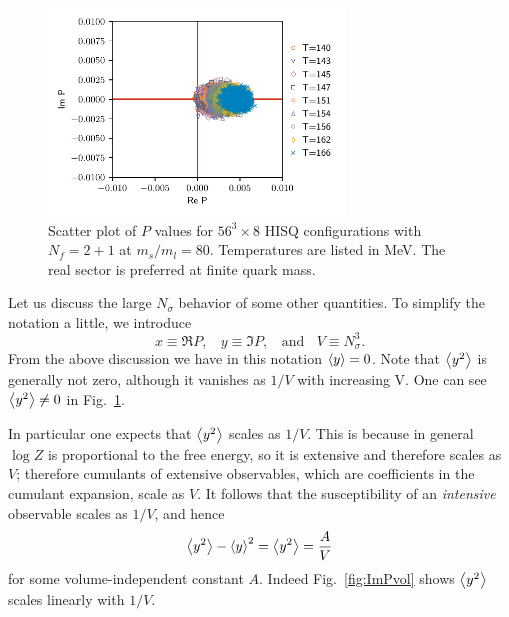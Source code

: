 \begin{figure}
  \centering
  \includegraphics[width=0.7\textwidth]
          {figs/ploopScatter_betaDependl568ms80.pdf}
  \caption{Scatter plot of $P$ values for $56^3\times8$ HISQ configurations
           with $N_f=2+1$ at $m_s/m_l=80$. Temperatures are listed in MeV. 
           The real sector is preferred at finite quark mass.}
  \label{fig:ploopScatter}
\end{figure}

Let us discuss the large $N_\sigma$ behavior of some other quantities.
To simplify the notation a little, we introduce
\begin{equation}
x\equiv \Re P,~~~~y\equiv \Im P,~~~~\text{and}~~~~V\equiv N_\sigma^3.
\end{equation}
From the above discussion we have in this notation $\ev{y}=0$.
Note that $\ev{y^2}$ is generally not zero,
although it vanishes as $1/V$ with increasing V.
One can see $\ev{y^2}\neq0$ in Fig.~\ref{fig:ploopScatter}.

In particular one expects that $\ev{y^2}$ scales as
$1/V$. This is because in general $\log Z$ is proportional
to the free energy, so it is extensive and therefore scales as $V$;
therefore cumulants of extensive observables, which are coefficients in
the cumulant expansion, scale as $V$. It follows that the
susceptibility of an {\it intensive} observable scales as $1/V$,
and hence
\begin{equation}\label{eq:fssim}
  \ev{y^2}-\ev{y}^2 =\ev{y^2}=\frac{A}{V}
\end{equation}
for some volume-independent constant $A$. Indeed Fig.~\ref{fig:ImPvol} shows 
$\ev{y^2}$ scales linearly with $1/V$.

